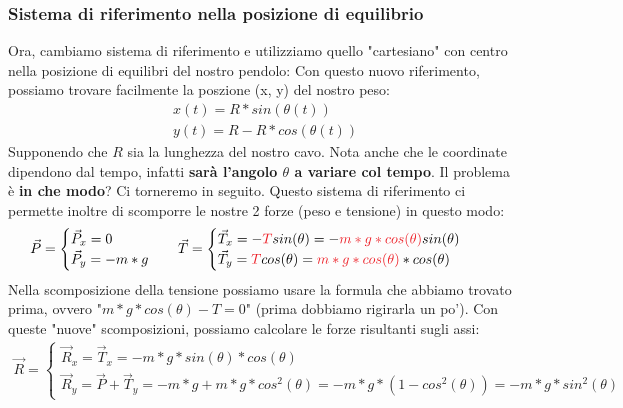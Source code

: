         \subsubsection{Sistema di riferimento nella posizione di equilibrio}
            Ora, cambiamo sistema di riferimento e utilizziamo quello "cartesiano" con centro nella posizione di equilibri del nostro pendolo:
            Con questo nuovo riferimento, possiamo trovare facilmente la poszione (x, y) del nostro peso:
            \begin{align*}
                &x(t) = R * sin(\theta(t))\\
                &y(t) = R - R*cos(\theta(t))
            \end{align*}
            Supponendo che $R$ sia la lunghezza del nostro cavo. Nota anche che le coordinate dipendono dal tempo, infatti \textbf{sarà l'angolo $\theta$ a variare col tempo}. Il problema è \textbf{in che modo}? Ci torneremo in seguito. Questo sistema di riferimento ci permette inoltre di scomporre le nostre 2 forze (peso e tensione) in questo modo:
            \begin{align*}
                &\vec{P} =
                \begin{cases}
                    \vec{P}_x = 0\\
                    \vec{P}_y = -m*g
                \end{cases}
                &&\vec{T} =
                \begin{cases}
                    \vec{T}_x = -\textcolor{Red}{T}sin(\theta) = -\textcolor{Red}{m*g*cos(\theta)}sin(\theta)\\
                    \vec{T}_y = \textcolor{Red}{T}cos(\theta) =  \textcolor{Red}{m*g*cos(\theta)}*cos(\theta)
                \end{cases}
            \end{align*}
            Nella scomposizione della tensione possiamo usare la formula che abbiamo trovato prima, ovvero "$m*g*cos(\theta) - T = 0$" (prima dobbiamo rigirarla un po'). Con queste "nuove" scomposizioni, possiamo calcolare le forze risultanti sugli assi:
            \begin{align*}
                \vec{R}=
                \begin{cases}
                    \vec{R}_x = \vec{T}_x = -m*g*sin(\theta)*cos(\theta)\\
                    \vec{R}_y = \vec{P} + \vec{T}_y = -m*g + m*g*cos^2(\theta) = -m*g*(1-cos^2(\theta)) = -m*g*sin^2(\theta)
                \end{cases}
            \end{align*}
